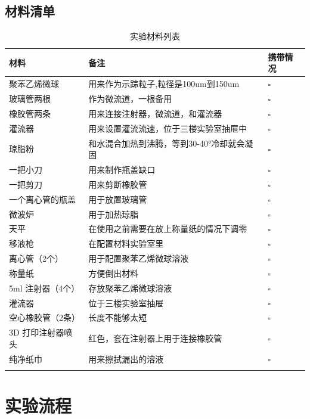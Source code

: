 \documentclass[12pt]{article}
\begin{document}
\subsection{材料清单}
{
    \footnotesize
    \begin{longtable}{@{} p{5cm} p{10cm} p{2cm} @{}}
        \toprule
        \textbf{材料} & \textbf{备注} & \textbf{携带情况} \\ 
        \midrule
        聚苯乙烯微球 & 用来作为示踪粒子,粒径是100um到150um & $\square$ \\ 
        玻璃管两根 & 作为微流道，一根备用 & $\square$ \\ 
        橡胶管两条 & 用来连接注射器，微流道，和灌流器 & $\square$ \\ 
        灌流器 & 用来设置灌流流速，位于三楼实验室抽屉中 & $\square$ \\ 
        琼脂粉 & 和水混合加热到沸腾，等到30-40°冷却就会凝固 & $\square$ \\ 
        一把小刀 & 用来制作瓶盖缺口 & $\square$ \\ 
        一把剪刀 & 用来剪断橡胶管 & $\square$ \\ 
        一个离心管的瓶盖 & 用于放置玻璃管 & $\square$ \\ 
        微波炉 & 用于加热琼脂 & $\square$ \\ 
        天平 & 在使用之前需要在放上称量纸的情况下调零 & $\square$ \\ 
        移液枪 & 在配置材料实验室里 & $\square$\\ 
        离心管（2个） & 用于配置聚苯乙烯微球溶液 & $\square$ \\ 
        称量纸 & 方便倒出材料 & $\square$\\ 
        5ml 注射器（4个） & 存放聚苯乙烯微球溶液 & $\square$ \\ 
        灌流器 & 位于三楼实验室抽屉 & $\square$ \\ 
        空心橡胶管（2条） & 长度不能够太短 & $\square$ \\ 
        3D 打印注射器喷头 & 红色，套在注射器上用于连接橡胶管 & $\square$ \\ 
        纯净纸巾 & 用来擦拭漏出的溶液 & $\square$ \\ 
        \bottomrule
        \caption{实验材料列表}
    \end{longtable}
    
}

\section{实验流程}
\end{document}
